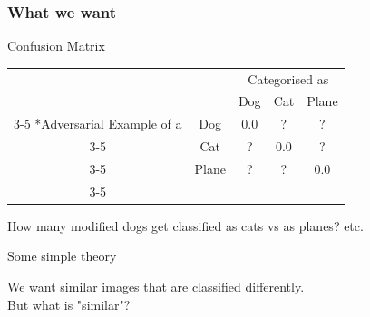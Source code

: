 \documentclass[10pt,usepdftitle=false,aspectratio=169]{beamer}
\begin{document}
\begin{frame}[fragile]
	\frametitle{What we want}
	\begin{block}{Confusion Matrix}
		\begin{table}
			\setlength{\extrarowheight}{2pt}
			\begin{tabular}{cc|c|c|c|}
				& \multicolumn{1}{c}{} & \multicolumn{3}{c}{Categorised as}\\
				& \multicolumn{1}{c}{} & \multicolumn{1}{c}{Dog}  & \multicolumn{1}{c}{Cat} & \multicolumn{1}{c}{Plane} \\\cline{3-5}
				\multirow{3}*{Adversarial Example of a}  & Dog & 0.0 & ? & ?\\\cline{3-5}
				& Cat & ? & 0.0 &  ? \\\cline{3-5}
				& Plane & ? & ? &  0.0 \\\cline{3-5}
			\end{tabular}
		\end{table}
		How many modified dogs get classified as cats vs as planes? etc.
	\end{block}
\end{frame}

\begin{frame}[plain]
	\huge Some simple theory
\end{frame}	

\begin{frame}[plain]
	\large We want similar images that are classified differently.\\
	But what is "similar"?
\end{frame}	
\end{document}
